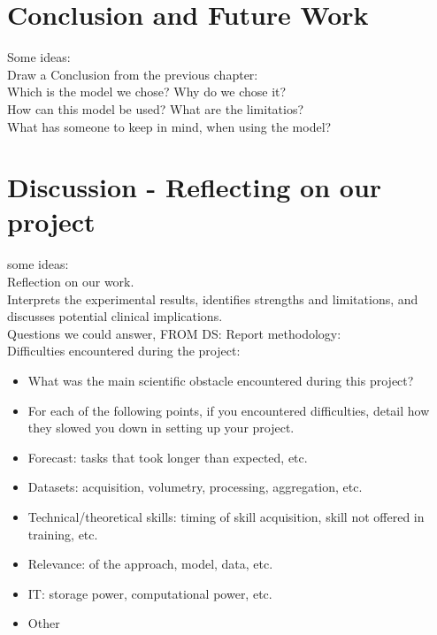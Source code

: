 \documentclass{article}
\begin{document}
\section{Conclusion and Future Work}

Some ideas:\\
Draw a Conclusion from the previous chapter: \\
Which is the model we chose? Why do we chose it? \\
How can this model be used? What are the limitatios? \\
What has someone to keep in mind, when using the model? 


\section{Discussion - Reflecting on our project}

some ideas: \\
Reflection on our work. \\
Interprets the experimental results, identifies strengths and limitations, and discusses potential clinical implications.\\

Questions we could answer, FROM DS: Report methodology:\\

Difficulties encountered during the project: 
\begin{itemize}
    \item What was the main scientific obstacle encountered during this project?
    \item For each of the following points, if you encountered difficulties, detail how they slowed you down in setting up your project.
    \item Forecast: tasks that took longer than expected, etc.
    \item Datasets: acquisition, volumetry, processing, aggregation, etc.
    \item Technical/theoretical skills: timing of skill acquisition, skill not offered in training, etc.
    \item Relevance: of the approach, model, data, etc.
    \item IT: storage power, computational power, etc.
    \item Other
\end{itemize}
\end{document}
